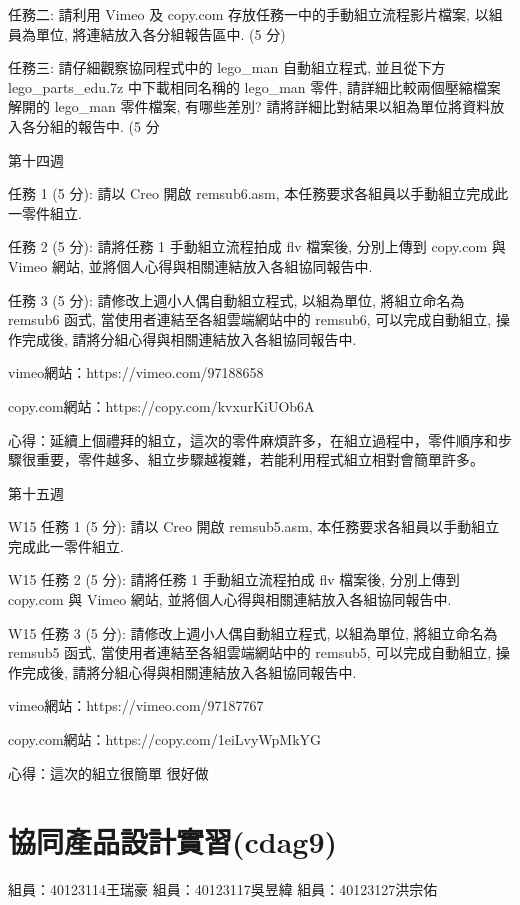 \documentclass[]{article}
\begin{document}
任務二: 請利用 Vimeo 及 copy.com 存放任務一中的手動組立流程影片檔案,
以組員為單位, 將連結放入各分組報告區中. (5 分)

任務三: 請仔細觀察協同程式中的 lego\_man 自動組立程式, 並且從下方
lego\_parts\_edu.7z 中下載相同名稱的 lego\_man 零件,
請詳細比較兩個壓縮檔案解開的 lego\_man 零件檔案, 有哪些差別?
請將詳細比對結果以組為單位將資料放入各分組的報告中. (5 分

第十四週

任務 1 (5 分): 請以 Creo 開啟 remsub6.asm,
本任務要求各組員以手動組立完成此一零件組立.

任務 2 (5 分): 請將任務 1 手動組立流程拍成 flv 檔案後, 分別上傳到
copy.com 與 Vimeo 網站, 並將個人心得與相關連結放入各組協同報告中.

任務 3 (5 分): 請修改上週小人偶自動組立程式, 以組為單位, 將組立命名為
remsub6 函式, 當使用者連結至各組雲端網站中的 remsub6, 可以完成自動組立,
操作完成後, 請將分組心得與相關連結放入各組協同報告中.

vimeo網站：https://vimeo.com/97188658

copy.com網站：https://copy.com/kvxurKiUOb6A

心得：延續上個禮拜的組立，這次的零件麻煩許多，在組立過程中，零件順序和步驟很重要，零件越多、組立步驟越複雜，若能利用程式組立相對會簡單許多。

第十五週

W15 任務 1 (5 分): 請以 Creo 開啟 remsub5.asm,
本任務要求各組員以手動組立完成此一零件組立.

W15 任務 2 (5 分): 請將任務 1 手動組立流程拍成 flv 檔案後, 分別上傳到
copy.com 與 Vimeo 網站, 並將個人心得與相關連結放入各組協同報告中.

W15 任務 3 (5 分): 請修改上週小人偶自動組立程式, 以組為單位,
將組立命名為 remsub5 函式, 當使用者連結至各組雲端網站中的 remsub5,
可以完成自動組立, 操作完成後, 請將分組心得與相關連結放入各組協同報告中.

vimeo網站：https://vimeo.com/97187767

copy.com網站：https://copy.com/1eiLvyWpMkYG

心得：這次的組立很簡單 很好做

\section{協同產品設計實習(cdag9)}\label{ux5354ux540cux7522ux54c1ux8a2dux8a08ux5be6ux7fd2cdag9}

組員：40123114王瑞豪 組員：40123117吳昱緯 組員：40123127洪宗佑
\end{document}

